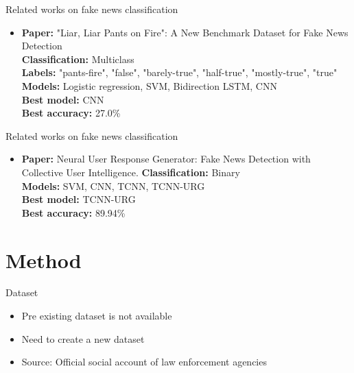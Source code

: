 \documentclass[12pt]{beamer}
\begin{document}
\begin{frame}{Related works on fake news classification}
    \begin{itemize}
        \item
        \textbf{Paper:} "Liar, Liar Pants on Fire": A New Benchmark Dataset for Fake News Detection \\
        \textbf{Classification:} Multiclass \\
        \textbf{Labels:} "pants-fire", "false", "barely-true", "half-true", "mostly-true", "true"\\
        \textbf{Models:} Logistic regression, SVM, Bidirection LSTM, CNN \\
        \textbf{Best model:} CNN \\
        \textbf{Best accuracy:} 27.0\% \\
    \end{itemize}
\end{frame}

\begin{frame}{Related works on fake news classification}
    \begin{itemize}
        \item
        \textbf{Paper:} Neural User Response Generator: Fake News Detection with Collective User Intelligence.
        \textbf{Classification:} Binary \\
        \textbf{Models:} SVM, CNN, TCNN, TCNN-URG \\
        \textbf{Best model:} TCNN-URG \\
        \textbf{Best accuracy:} 89.94\% \\
    \end{itemize}
\end{frame}

\section{Method}

\begin{frame}{Dataset}
    \begin{itemize}
        \item Pre existing dataset is not available
        \item Need to create a new dataset
        \item Source: Official social account of law enforcement agencies
    \end{itemize}
\end{frame}
\end{document}
